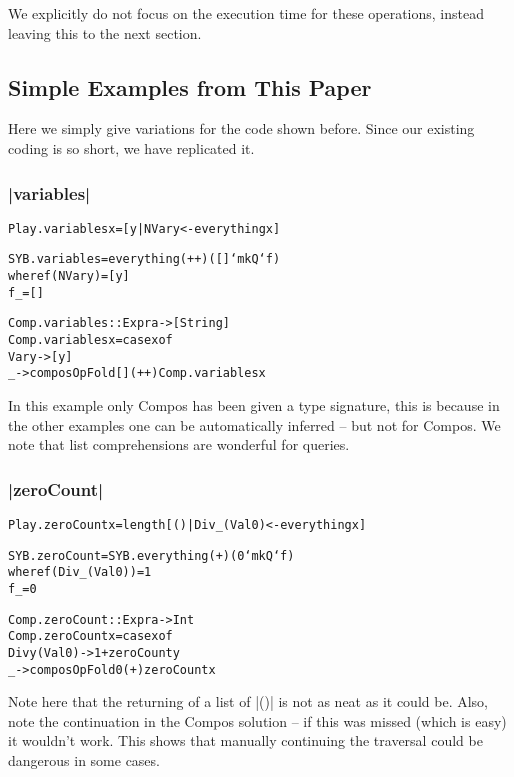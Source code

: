 \documentclass[preprint]{sigplanconf}
\newenvironment{code}{\begin{alltt}\small}{\end{alltt}}
\begin{document}
We explicitly do not focus on the execution time for these operations, instead leaving this to the next section.

\subsection{Simple Examples from This Paper}

Here we simply give variations for the code shown before. Since our existing coding is so short, we have replicated it.

\subsubsection{|variables|}

\begin{code}
Play.variables x = [y | NVar y <- everything x]

SYB.variables = everything (++) ([] `mkQ` f)
    where  f (NVar y)  = [y]
           f _         = []

Comp.variables :: Expr a -> [String]
Comp.variables x = case x of
    Var y -> [y]
    _ -> composOpFold [] (++) Comp.variables x
\end{code}

In this example only Compos has been given a type signature, this is because in the other examples one can be automatically inferred -- but not for Compos. We note that list comprehensions are wonderful for queries.

\subsubsection{|zeroCount|}

\begin{code}
Play.zeroCount x = length [() | Div _ (Val 0) <- everything x]

SYB.zeroCount = SYB.everything (+) (0 `mkQ` f)
    where  f (Div _ (Val 0))  = 1
           f _                  = 0

Comp.zeroCount :: Expr a -> Int
Comp.zeroCount x = case x of
    Div y (Val 0) -> 1 + zeroCount y
    _ -> composOpFold 0 (+) zeroCount x
\end{code}

Note here that the returning of a list of |()| is not as neat as it could be. Also, note the continuation in the Compos solution -- if this was missed (which is easy) it wouldn't work. This shows that manually continuing the traversal could be dangerous in some cases.
\end{document}
